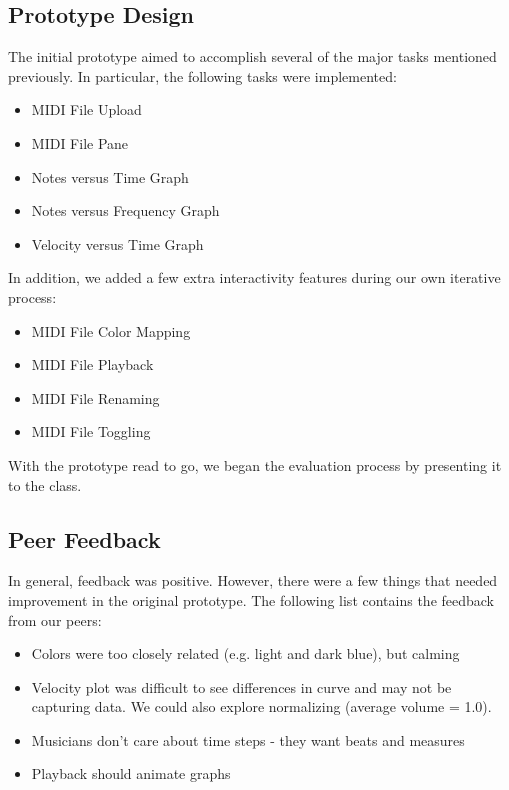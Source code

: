 \documentclass[journal]{vgtc}                %
\begin{document}
\subsection{Prototype Design}

The initial prototype aimed to accomplish several of the major tasks mentioned
previously. In particular, the following tasks were implemented:

\begin{itemize}
  \item MIDI File Upload
  \item MIDI File Pane
  \item Notes versus Time Graph
  \item Notes versus Frequency Graph
  \item Velocity versus Time Graph
\end{itemize}

In addition, we added a few extra interactivity features during our own
iterative process:

\begin{itemize}
  \item MIDI File Color Mapping
  \item MIDI File Playback
  \item MIDI File Renaming
  \item MIDI File Toggling
\end{itemize}

With the prototype read to go, we began the evaluation process by presenting
it to the class.

\subsection{Peer Feedback}

In general, feedback was positive. However, there were a few things
that needed improvement in the original prototype. The following
list contains the feedback from our peers:

\begin{itemize}
  \item Colors were too closely related (e.g. light and dark blue), but calming
  \item Velocity plot was difficult to see differences in curve and may not be capturing data.
  We could also explore normalizing (average volume = 1.0).
  \item Musicians don't care about time steps - they want beats and measures
  \item Playback should animate graphs
\end{itemize}
\end{document}
